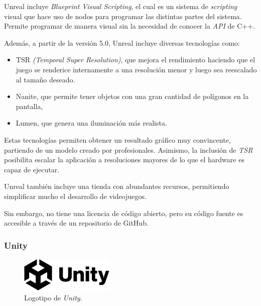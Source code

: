 \bigskip

Unreal incluye \textit{Blueprint Visual Scripting}, el cual es un sistema de \textit{scripting} visual que hace uso de nodos para programar las distintas partes del sistema. Permite programar de manera visual sin la necesidad de conocer la \textit{API} de C++.

\bigskip

Además, a partir de la versión 5.0, Unreal incluye diversas tecnologías como: 

\begin{itemize}
   \item TSR \textit{(Temporal Super Resolution)}, que mejora el rendimiento haciendo que el juego se renderice internamente a una resolución menor y luego sea reescalado al tamaño deseado.
   \item Nanite, que permite tener objetos con una gran cantidad de polígonos en la pantalla, 
   \item Lumen, que genera una iluminación más realista.
\end{itemize}

Estas tecnologías permiten obtener un resultado gráfico muy convincente, partiendo de un modelo creado por profesionales. Asimismo, la inclusión de \textit{TSR} posibilita escalar la aplicación a resoluciones mayores de lo que el hardware es capaz de ejecutar.

\bigskip

Unreal también incluye una tienda con abundantes recursos, permitiendo simplificar mucho el desarrollo de videojuegos.

\bigskip

Sin embargo, no tiene una licencia de código abierto, pero su código fuente es accesible a través de un repositorio de GitHub.

\subsubsection{Unity}

\begin{figure}[H]
   \centering
   \includegraphics[width=0.4\textwidth]{imagenes/UNITY_LOGO.png}
   \caption{Logotipo de \textit{Unity}\cite{unity}.}
\end{figure}

